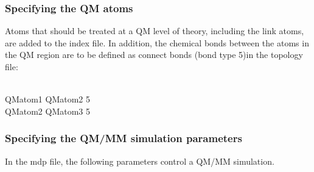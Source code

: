 \subsubsection{Specifying the QM atoms}

Atoms that should be treated at a QM level of theory, including the
link atoms, are added to the index file. In addition, the chemical
bonds between the atoms in the QM region are to be defined as
connect bonds (bond type 5)in the topology file:

\begin{tt}
[ bonds ]\\
QMatom1 QMatom2 5\\
QMatom2 QMatom3 5\\
\end{tt}

\subsubsection{Specifying the QM/MM simulation parameters}

In the mdp file, the following parameters control a QM/MM simulation.

